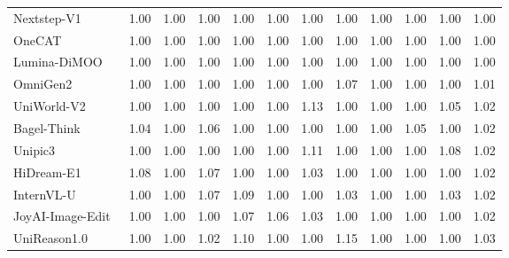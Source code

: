 \documentclass{llmxive}
\begin{document}
\begin{table}[t]
{\begin{tabular}{l|cccccccccc|c}
            Nextstep-V1~\cite{han2025nextstep}
            & 1.00 & 1.00 & 1.00 & 1.00 & 1.00 & 1.00 & 1.00 & 1.00 & 1.00 & 1.00
            & \cellcolor[HTML]{C8C8C8}1.00 \\

            OneCAT~\cite{li2025onecat}
            & 1.00 & 1.00 & 1.00 & 1.00 & 1.00 & 1.00 & 1.00 & 1.00 & 1.00 & 1.00
            & \cellcolor[HTML]{C8C8C8}1.00 \\

            Lumina-DiMOO~\cite{xin2025lumina}
            & 1.00 & 1.00 & 1.00 & 1.00 & 1.00 & 1.00 & 1.00 & 1.00 & 1.00 & 1.00
            & \cellcolor[HTML]{C8C8C8}1.00 \\

            OmniGen2~\cite{wu2025omnigen2}
            & 1.00 & 1.00 & 1.00 & 1.00 & 1.00 & 1.00 & 1.07 & 1.00 & 1.00 & 1.00
            & \cellcolor[HTML]{C8C8C8}1.01  \\

            UniWorld-V2~\cite{li2025uniworld}
            & 1.00 & 1.00 & 1.00 & 1.00 & 1.00 & 1.13 & 1.00 & 1.00 & 1.00 & 1.05
            & \cellcolor[HTML]{C8C8C8}1.02 \\

            Bagel-Think~\cite{deng2025emerging}
            & 1.04 & 1.00 & 1.06 & 1.00 & 1.00 & 1.00 & 1.00 & 1.00 & 1.05 & 1.00
            & \cellcolor[HTML]{C8C8C8}1.02 \\

            Unipic3~\cite{wei2026skywork}
            & 1.00 & 1.00 & 1.00 & 1.00 & 1.00 & 1.11 & 1.00 & 1.00 & 1.00 & 1.08
            & \cellcolor[HTML]{C8C8C8}1.02 \\

            HiDream-E1~\cite{cai2025hidream}
            & 1.08 & 1.00 & 1.07 & 1.00 & 1.00 & 1.03 & 1.00 & 1.00 & 1.00 & 1.00
            & \cellcolor[HTML]{C8C8C8}1.02  \\

            InternVL-U~\cite{tian2026internvl}
            & 1.00 & 1.00 & 1.07 & 1.09 & 1.00 & 1.00 & 1.03 & 1.00 & 1.00 & 1.03
            & \cellcolor[HTML]{C8C8C8}1.02 \\

            JoyAI-Image-Edit~\cite{joyaiimage2026}
            & 1.00 & 1.00 & 1.00 & 1.07 & 1.06 & 1.03 & 1.00 & 1.00 & 1.00 & 1.00
            & \cellcolor[HTML]{C8C8C8}1.02 \\

            UniReason1.0~\cite{wang2026unireason}
            & 1.00 & 1.00 & 1.02 & 1.10 & 1.00 & 1.00 & 1.15 & 1.00 & 1.00 & 1.00
            & \cellcolor[HTML]{C8C8C8}1.03 \\


\end{tabular}}
\end{table}
\end{document}
